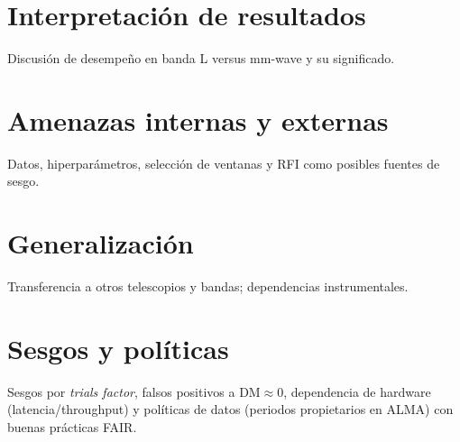 
\section{Interpretación de resultados}
Discusión de desempeño en banda L versus mm-wave y su significado.

\section{Amenazas internas y externas}
Datos, hiperparámetros, selección de ventanas y RFI como posibles fuentes de sesgo.

\section{Generalización}
Transferencia a otros telescopios y bandas; dependencias instrumentales.

\section{Sesgos y políticas}
Sesgos por \textit{trials factor}, falsos positivos a DM\(\approx 0\), dependencia de hardware (latencia/throughput) y políticas de datos (periodos propietarios en ALMA) con buenas prácticas FAIR.


